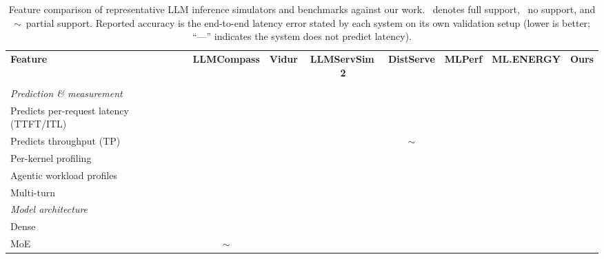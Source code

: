 \newcommand{\cmark}{\textcolor{okgreen}{\checkmark}}
\newcommand{\xmark}{\textcolor{nored}{\texttimes}}
\newcommand{\pmark}{\textcolor{partialorange}{$\sim$}}
\begin{table}[t]
\caption{Feature comparison of representative LLM inference simulators and benchmarks against our work. \cmark\ denotes full support, \xmark\ no support, and \pmark\ partial support. Reported accuracy is the end-to-end latency error stated by each system on its own validation setup (lower is better; ``---'' indicates the system does not predict latency).}
\label{tab:comparison}
\centering
\small
\setlength{\tabcolsep}{4pt}
\renewcommand{\arraystretch}{1.1}
\begin{adjustbox}{max width=\textwidth}
\begin{tabular}{l ccccccc}
\toprule
\textbf{Feature} & \textbf{LLMCompass} & \textbf{Vidur} & \textbf{LLMServSim\,2} & \textbf{DistServe} & \textbf{MLPerf} & \textbf{ML.ENERGY} & \textbf{Ours} \\
 & \scriptsize\citep{llmcompass} & \scriptsize\citep{vidur} & \scriptsize\citep{llmservingsim} & \scriptsize\citep{distserve} & \scriptsize\citep{mlperf} & \scriptsize\citep{mlenergy} & \\
\midrule
\multicolumn{8}{l}{\emph{Prediction \& measurement}} \\
\quad Predicts per-request latency (TTFT/ITL) & \cmark & \cmark & \cmark & \cmark & \xmark & \xmark & \cmark \\
\quad Predicts throughput (TP)                & \cmark & \cmark & \cmark & \pmark & \xmark & \xmark & \cmark \\
\quad Per-kernel profiling                    & \xmark & \xmark & \xmark & \xmark & \xmark & \xmark & \textbf{\cmark} \\
\quad Agentic workload profiles               & \xmark & \xmark & \xmark & \xmark & \xmark & \xmark & \textbf{\cmark} \\
\quad Multi-turn                              & \xmark & \xmark & \xmark & \xmark & \xmark & \xmark & \textbf{\cmark} \\
\midrule
\multicolumn{8}{l}{\emph{Model architecture}} \\
\quad Dense                                   & \cmark & \cmark & \cmark & \cmark & \cmark & \cmark & \cmark \\
\quad MoE                                     & \pmark & \xmark & \cmark & \xmark & \xmark & \cmark & \cmark \\

\end{tabular}
\end{adjustbox}
\end{table}
